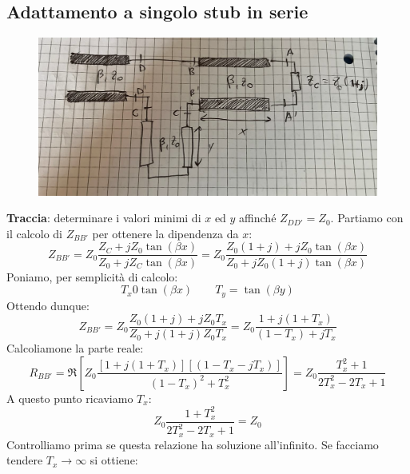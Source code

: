 \documentclass{book}
\begin{document}
        \subsection{Adattamento a singolo stub in serie}
            \begin{figure}[h!]
                \center 
                \includegraphics[width=0.75\linewidth]{Chapter_two/Chapt2img21.png}
            \end{figure}
        \textbf{Traccia}: determinare i valori minimi di $x$ ed $y$ affinché $Z_{DD'}=Z_{0}$.
        Partiamo con il calcolo di $Z_{BB'}$ per ottenere la dipendenza da $x$:
        \begin{equation}
            Z_{BB'} = Z_{0} \frac{Z_{C}+jZ_{0}\tan(\beta x)}{Z_{0}+jZ_{C}\tan(\beta x)} =
            Z_{0} \frac{Z_{0}(1+j)+jZ_{0}\tan(\beta x)}{Z_{0}+jZ_{0}(1+j)\tan(\beta x)}
        \end{equation}
        Poniamo, per semplicità di calcolo:
        \begin{equation}
            T_{x}0\tan(\beta x) \qquad T_{y}=\tan(\beta y)
         \end{equation}
         Ottendo dunque:
         \begin{equation}
            Z_{BB'} = Z_{0} \frac{Z_{0}(1+j)+jZ_{0}T_{x}}{Z_{0}+j(1+j)Z_{0}T_{x}} = Z_{0}\frac{1+j(1+T_{x})}{(1-T_{x})+jT_{x}}
         \end{equation}
         Calcoliamone la parte reale:
         \begin{equation}
            R_{BB'} = \Re[Z_{0} \frac{[1+j(1+T_{x})][(1-T_{x}-jT_{x})]}{(1-T_{x})^{2}+T_{x} ^{2}}] = Z_{0}\frac{T_{x} ^{2}+1}{2T_{x} ^{2}-2T_{x}+1}
         \end{equation}
         A questo punto ricaviamo $T_{x}$:
         \begin{equation}
            Z_{0} \frac{1+T_{x} ^{2}}{2T_{x} ^{2}-2T_{x}+1} = Z_{0}
         \end{equation}
         Controlliamo prima se questa relazione ha soluzione all'infinito. Se facciamo tendere $T_{x} \to \infty$ si ottiene:
\end{document}
